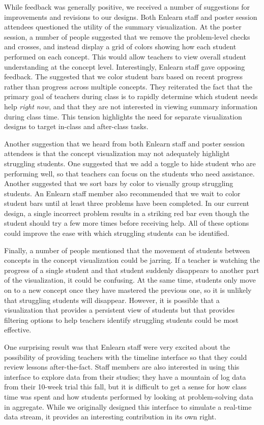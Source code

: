 \documentclass{sigchi}
\begin{document}
While feedback was generally positive, we received a number of suggestions for improvements and revisions to our designs. Both Enlearn staff and poster session attendees questioned the utility of the summary visualization. At the poster session, a number of people suggested that we remove the problem-level checks and crosses, and instead display a grid of colors showing how each student performed on each concept. This would allow teachers to view overall student understanding at the concept level. Interestingly, Enlearn staff gave opposing feedback. The suggested that we color student bars based on recent progress rather than progress across multiple concepts. They reiterated the fact that the primary goal of teachers during class is to rapidly determine which student needs help \emph{right now}, and that they are not interested in viewing summary information during class time. This tension highlights the need for separate visualization designs to target in-class and after-class tasks.

Another suggestion that we heard from both Enlearn staff and poster session attendees is that the concept visualization may not adequately highlight struggling students. One suggested that we add a toggle to hide student who are performing well, so that teachers can focus on the students who need assistance. Another suggested that we sort bars by color to visually group struggling students. An Enlearn staff member also recommended that we wait to color student bars until at least three problems have been completed. In our current design, a single incorrect problem results in a striking red bar even though the student should try a few more times before receiving help. All of these options could improve the ease with which struggling students can be identified.

Finally, a number of people mentioned that the movement of students between concepts in the concept visualization could be jarring. If a teacher is watching the progress of a single student and that student suddenly disappears to another part of the visualization, it could be confusing. At the same time, students only move on to a new concept once they have mastered the previous one, so it is unlikely that struggling students will disappear. However, it is possible that a visualization that provides a persistent view of students but that provides filtering options to help teachers identify struggling students could be most effective.

One surprising result was that Enlearn staff were very excited about the possibility of providing teachers with the timeline interface so that they could review lessons after-the-fact. Staff members are also interested in using this interface to explore data from their studies; they have a mountain of log data from their 10-week trial this fall, but it is difficult to get a sense for how class time was spent and how students performed by looking at problem-solving data in aggregate. While we originally designed this interface to simulate a real-time data stream, it provides an interesting contribution in its own right.
\end{document}
